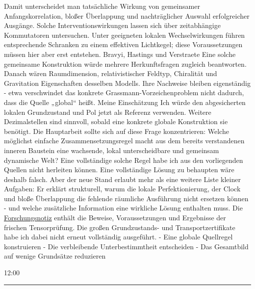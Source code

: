 Damit unterscheidet man tatsächliche Wirkung von gemeinsamer
Anfangskorrelation, bloßer Überlappung und nachträglicher Auswahl
erfolgreicher Ausgänge. Solche Interventionswirkungen lassen sich über
zeitabhängige Kommutatoren untersuchen. Unter geeigneten lokalen
Wechselwirkungen führen entsprechende Schranken zu einem effektiven
Lichtkegel; diese Voraussetzungen müssen hier aber erst entstehen.
Bravyi, Hastings und Verstraete Eine solche gemeinsame Konstruktion
würde mehrere Herkunftsfragen zugleich beantworten. Danach wären
Raumdimension, relativistischer Feldtyp, Chiralität und Gravitation
Eigenschaften desselben Modells. Ihre Nachweise bleiben eigenständig -
etwa verschwindet das konkrete Grassmann-Vorzeichenproblem nicht
dadurch, dass die Quelle „global`` heißt. Meine Einschätzung Ich würde
den abgesicherten lokalen Grundzustand und Pol jetzt als Referenz
verwenden. Weitere Dezimalstellen sind sinnvoll, sobald eine konkrete
globale Konstruktion sie benötigt. Die Hauptarbeit sollte sich auf diese
Frage konzentrieren: Welche möglichst einfache Zusammensetzungsregel
macht aus dem bereits verstandenen inneren Baustein eine wachsende,
lokal unterscheidbare und gemeinsam dynamische Welt? Eine vollständige
solche Regel habe ich aus den vorliegenden Quellen nicht herleiten
können. Eine vollständige Lösung zu behaupten wäre deshalb falsch. Aber
der neue Stand erlaubt mehr als eine weitere Liste kleiner Aufgaben: Er
erklärt strukturell, warum die lokale Perfektionierung, der Clock und
bloße Überlappung die fehlende räumliche Ausführung nicht ersetzen
können - und welche zusätzliche Information eine wirkliche Lösung
enthalten muss. Die
\href{outputs/TFPT_Fundamentale_Reduktion_2026-09-15.md}{Forschungsnotiz}
enthält die Beweise, Voraussetzungen und Ergebnisse der frischen
Tensorprüfung. Die großen Grundzustands- und Transportzertifikate habe
ich dabei nicht erneut vollständig ausgeführt. - Eine globale Quellregel
konstruieren - Die verbleibende Unterbestimmtheit entscheiden - Das
Gesamtbild auf wenige Grundsätze reduzieren

12:00

\begin{center}\rule{0.5\linewidth}{0.5pt}\end{center}

